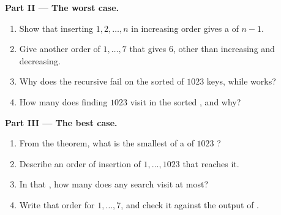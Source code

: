 \begin{problem}
\medskip\noindent\textbf{Part II --- The worst case.}
\begin{enumerate}[resume]
  \item Show that inserting $1, 2, \dots, n$ in increasing order gives a  of  $n - 1$.
  \item Give another order of $1, \dots, 7$ that gives  $6$, other than increasing and decreasing.
  \item Why does the recursive  fail on the sorted  of $1023$ keys, while  works?
  \item How many  does finding $1023$ visit in the sorted , and why?
\end{enumerate}

\medskip\noindent\textbf{Part III --- The best case.}
\begin{enumerate}[resume]
  \item From the theorem, what is the smallest  of a  of $1023$ ?
  \item Describe an order of insertion of $1, \dots, 1023$ that reaches it.
  \item In that , how many  does any search visit at most?
  \item Write that order for $1, \dots, 7$, and check it against the output of .
\end{enumerate}


\end{problem}
